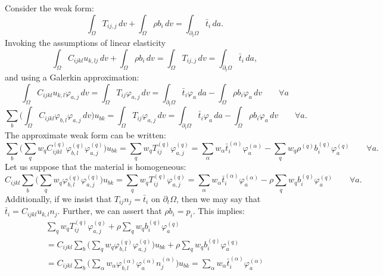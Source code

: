 \documentclass[11pt]{article} %
\begin{document}
Consider the weak form:
\begin{equation}
	\int_{\Omega} T_{ij,j} \, dv + \int_{\Omega} \rho b_i \, dv = \int_{\partial_t \Omega} \bar{t}_{i} \, da.
\end{equation}
Invoking the assumptions of linear elasticity
\begin{equation}
	\int_{\Omega} C_{ijkl} u_{k,lj} \, dv + \int_{\Omega} \rho b_i \, dv = \int_{\Omega} T_{ij,j} \, dv = \int_{\partial_t \Omega} \bar{t}_{i} \, da,
\end{equation}
and using a Galerkin approximation:
\begin{equation}
	\int_{\Omega} C_{ijkl} u_{k,l} \varphi_{a,j} \, dv = \int_{\Omega} T_{ij} \varphi_{a,j} \, dv = \int_{\partial_t \Omega} \bar{t}_{i} \varphi_a \, da - \int_{\Omega} \rho b_i \varphi_a \, dv \qquad \forall a
\end{equation}
\begin{equation}
	\sum_b \bigg( \int_{\Omega} C_{ijkl} \varphi_{b,l} \varphi_{a,j} \, dv \bigg) u_{bk} = \int_{\Omega} T_{ij} \varphi_{a,j} \, dv = \int_{\partial_t \Omega} \bar{t}_{i} \varphi_a \, da - \int_{\Omega} \rho b_i \varphi_a \, dv \qquad \forall a.
\end{equation}
The approximate weak form can be written:
\begin{equation}
	\sum_b \bigg( \sum_q w_q C^{(q)}_{ijkl} \varphi^{(q)}_{b,l} \varphi^{(q)}_{a,j} \bigg) u_{bk} = \sum_q w_q T^{(q)}_{ij} \varphi^{(q)}_{a,j} = \sum_{\alpha} w_{\alpha} \bar{t}^{(\alpha)}_{i} \varphi^{(\alpha)}_a - \sum_q w_q \rho^{(q)} b^{(q)}_i \varphi^{(q)}_a \qquad \forall a.
\end{equation}
Let us suppose that the material is homogeneous:
\begin{equation}
	C_{ijkl} \sum_b \bigg( \sum_q w_q \varphi^{(q)}_{b,l} \varphi^{(q)}_{a,j} \bigg) u_{bk} = \sum_q w_q T^{(q)}_{ij} \varphi^{(q)}_{a,j} = \sum_{\alpha} w_{\alpha} \bar{t}^{(\alpha)}_{i} \varphi^{(\alpha)}_a - \rho \sum_q w_q b^{(q)}_i \varphi^{(q)}_a \qquad \forall a.
\end{equation}
Additionally, if we insist that $T_{ij} n_j = \bar{t}_i$ on $\partial_t \Omega$, then we may say that $\bar{t}_i = C_{ijkl} u_{k,l} n_j$. Further, we can assert that $\rho b_i = p_i$. This implies:
\begin{eqnarray}
	\sum_q w_q T^{(q)}_{ij} \varphi^{(q)}_{a,j} + \rho \sum_q w_q b^{(q)}_i \varphi^{(q)}_a \nonumber \\ = C_{ijkl} \sum_b \bigg( \sum_q w_q \varphi^{(q)}_{b,l} \varphi^{(q)}_{a,j} \bigg) u_{bk} + \rho \sum_q w_q b^{(q)}_i \varphi^{(q)}_a \\ \nonumber = C_{ijkl} \sum_b \bigg( \sum_{\alpha} w_{\alpha} \varphi^{(\alpha)}_{b,l} \varphi^{(\alpha)}_a n^{(\alpha)}_j \bigg) u_{bk} = \sum_{\alpha} w_{\alpha} \bar{t}^{(\alpha)}_{i} \varphi^{(\alpha)}_a
\end{eqnarray}
\end{document}
